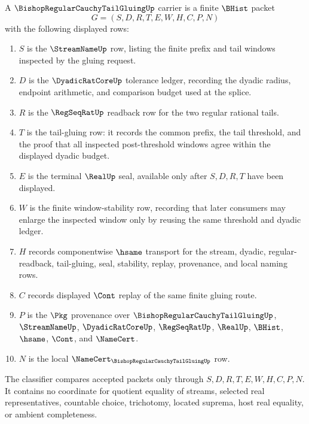 \begin{definition}
\label{def:bishop-regular-cauchy-tail-gluing-carrier}
A $\BishopRegularCauchyTailGluingUp$ carrier is a finite $\BHist$ packet
$$
G=(S,D,R,T,E,W,H,C,P,N)
$$
with the following displayed rows:
\begin{enumerate}
\item $S$ is the $\StreamNameUp$ row, listing the finite prefix and tail windows inspected by the gluing request.
\item $D$ is the $\DyadicRatCoreUp$ tolerance ledger, recording the dyadic radius, endpoint arithmetic, and comparison budget used at the splice.
\item $R$ is the $\RegSeqRatUp$ readback row for the two regular rational tails.
\item $T$ is the tail-gluing row: it records the common prefix, the tail threshold, and the proof that all inspected post-threshold windows agree within the displayed dyadic budget.
\item $E$ is the terminal $\RealUp$ seal, available only after $S,D,R,T$ have been displayed.
\item $W$ is the finite window-stability row, recording that later consumers may enlarge the inspected window only by reusing the same threshold and dyadic ledger.
\item $H$ records componentwise $\hsame$ transport for the stream, dyadic, regular-readback, tail-gluing, seal, stability, replay, provenance, and local naming rows.
\item $C$ records displayed $\Cont$ replay of the same finite gluing route.
\item $P$ is the $\Pkg$ provenance over $\BishopRegularCauchyTailGluingUp$, $\StreamNameUp$, $\DyadicRatCoreUp$, $\RegSeqRatUp$, $\RealUp$, $\BHist$, $\hsame$, $\Cont$, and $\NameCert$.
\item $N$ is the local $\NameCert_{\BishopRegularCauchyTailGluingUp}$ row.
\end{enumerate}
The classifier compares accepted packets only through $S,D,R,T,E,W,H,C,P,N$. It contains no coordinate for quotient equality of streams, selected real representatives, countable choice, trichotomy, located suprema, host real equality, or ambient completeness.
\end{definition}

